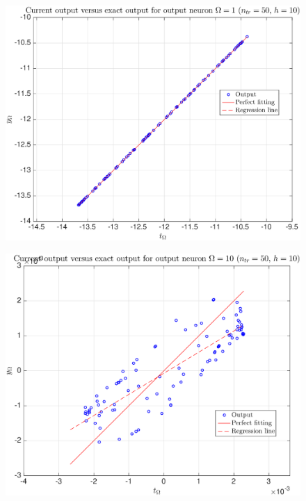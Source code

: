 \documentclass[11pt,a4paper]{article}
\theoremstyle{definition}
\theoremstyle{theorem}
\numberwithin{equation}{section}
\begin{document}
	\begin{figure}[H]
		\center
		\includegraphics[scale = 0.5]{fig30}
		\caption{}
	\end{figure}
	
	\begin{figure}[H]
		\center
		\includegraphics[scale = 0.5]{fig31}
		\caption{}
	\end{figure}
	
\end{document}
